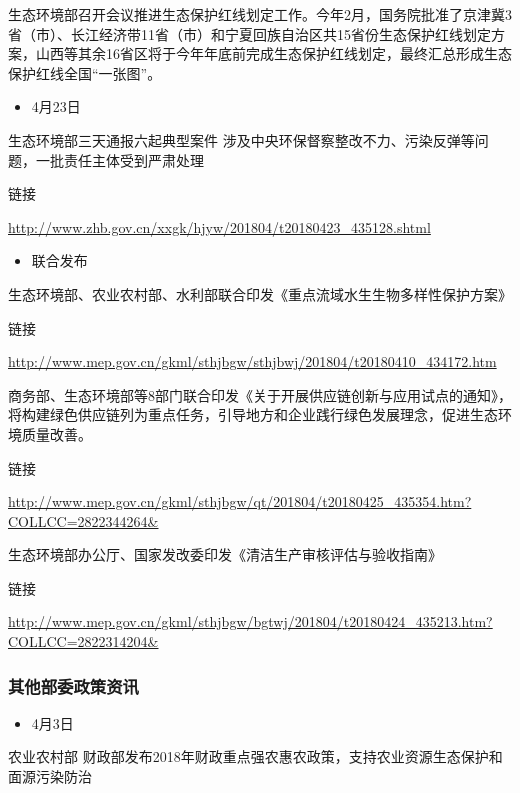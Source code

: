 \documentclass[
]{book}
\providecommand{\tightlist}{%
  \setlength{\itemsep}{0pt}\setlength{\parskip}{0pt}}
\begin{document}
生态环境部召开会议推进生态保护红线划定工作。今年2月，国务院批准了京津冀3省（市）、长江经济带11省（市）和宁夏回族自治区共15省份生态保护红线划定方案，山西等其余16省区将于今年年底前完成生态保护红线划定，最终汇总形成生态保护红线全国``一张图''。

\begin{itemize}
\tightlist
\item
  4月23日
\end{itemize}

生态环境部三天通报六起典型案件 涉及中央环保督察整改不力、污染反弹等问题，一批责任主体受到严肃处理

链接

\url{http://www.zhb.gov.cn/xxgk/hjyw/201804/t20180423_435128.shtml}

\begin{itemize}
\tightlist
\item
  联合发布
\end{itemize}

生态环境部、农业农村部、水利部联合印发《重点流域水生生物多样性保护方案》

链接

\url{http://www.mep.gov.cn/gkml/sthjbgw/sthjbwj/201804/t20180410_434172.htm}

商务部、生态环境部等8部门联合印发《关于开展供应链创新与应用试点的通知》，将构建绿色供应链列为重点任务，引导地方和企业践行绿色发展理念，促进生态环境质量改善。

链接

\url{http://www.mep.gov.cn/gkml/sthjbgw/qt/201804/t20180425_435354.htm?COLLCC=2822344264\&}

生态环境部办公厅、国家发改委印发《清洁生产审核评估与验收指南》

链接

\url{http://www.mep.gov.cn/gkml/sthjbgw/bgtwj/201804/t20180424_435213.htm?COLLCC=2822314204\&}

\hypertarget{ux5176ux4ed6ux90e8ux59d4ux653fux7b56ux8d44ux8baf}{%
\subsubsection*{其他部委政策资讯}\label{ux5176ux4ed6ux90e8ux59d4ux653fux7b56ux8d44ux8baf}}

\begin{itemize}
\tightlist
\item
  4月3日
\end{itemize}

农业农村部 财政部发布2018年财政重点强农惠农政策，支持农业资源生态保护和面源污染防治
\end{document}
